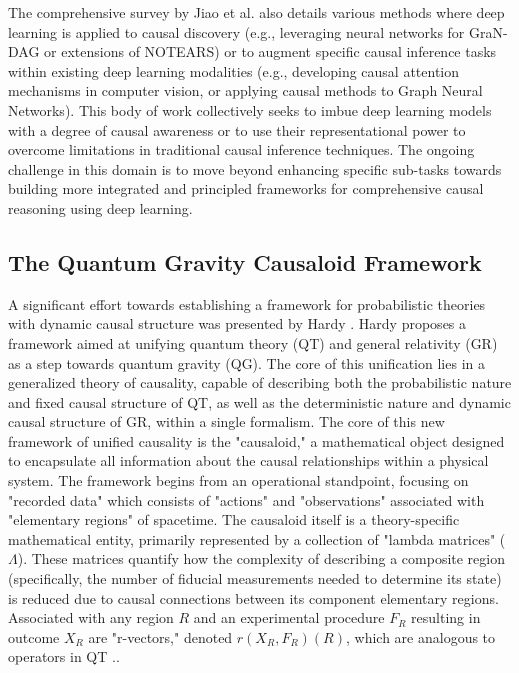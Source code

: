 The comprehensive survey by Jiao et al. \cite{jiao2024causal} also details various methods where deep learning is applied to causal discovery (e.g., leveraging neural networks for GraN-DAG or extensions of NOTEARS) or to augment specific causal inference tasks within existing deep learning modalities (e.g., developing causal attention mechanisms in computer vision, or applying causal methods to Graph Neural Networks). This body of work collectively seeks to imbue deep learning models with a degree of causal awareness or to use their representational power to overcome limitations in traditional causal inference techniques. The ongoing challenge in this domain is to move beyond enhancing specific sub-tasks towards building more integrated and principled frameworks for comprehensive causal reasoning using deep learning.

\subsection{The Quantum Gravity Causaloid Framework}

A significant effort towards establishing a framework for probabilistic theories with dynamic causal structure was presented by Hardy \cite{hardy2005probability}. Hardy proposes a framework aimed at unifying quantum theory (QT) and general relativity (GR) as a step towards quantum gravity (QG). The core of this unification lies in a generalized theory of causality, capable of describing both the probabilistic nature and fixed causal structure of QT, as well as the deterministic nature and dynamic causal structure of GR, within a single formalism. The core of this new framework of unified causality is the "causaloid," a mathematical object designed to encapsulate all information about the causal relationships within a physical system.
The framework begins from an operational standpoint, focusing on "recorded data" which consists of "actions" and "observations" associated with "elementary regions" of spacetime.
The causaloid itself is a theory-specific mathematical entity, primarily represented by a collection of "lambda matrices" ($\Lambda$). These matrices quantify how the complexity of describing a composite region (specifically, the number of fiducial measurements needed to determine its state) is reduced due to causal connections between its component elementary regions.
Associated with any region $R$ and an experimental procedure $F_R$ resulting in outcome $X_R$ are "r-vectors," denoted $r(X_R, F_R)(R)$, which are analogous to operators in QT \cite{hardy2005probability}..

